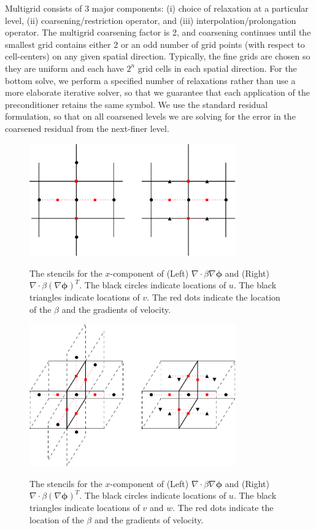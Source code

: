 \documentclass[final]{siamltex}
\def\phib {\boldsymbol{\phi}}
\begin{document}
Multigrid consists of 3 major components: (i) choice of relaxation at a particular level,
(ii) coarsening/restriction operator, and (iii) interpolation/prolongation operator.
The multigrid coarsening factor is 2, and coarsening continues until the smallest
grid contains either 2 or an odd number of grid points (with respect to cell-centers)
on any given spatial direction.  Typically, the fine grids are chosen so they are
uniform and each have $2^n$ grid cells in each spatial direction.
For the bottom solve, we perform a specified number of relaxations
rather than use a more elaborate iterative solver, so that we guarantee that each
application of the preconditioner retains the same symbol.  We use the standard residual
formulation, so that on all coarsened levels we are solving for the error in the
coarsened residual from the next-finer level.

\begin{figure}[tb]
\centering
\includegraphics[width=3.5in]{viscOp}
\label{fig:viscOp}
\caption{The stencils for the $x$-component of (Left) $\nabla\cdot\beta\nabla\phib$ and 
(Right) $\nabla\cdot\beta(\nabla\phib)^T$.  
The black circles indicate locations of $u$.
The black triangles indicate locations of $v$.
The red dots indicate the location of the $\beta$ and the gradients of velocity.}
\end{figure}
\begin{figure}[tb]
\centering
\includegraphics[width=3.5in]{viscOp_3d}
\label{fig:viscOp_3d}
\caption{The stencils for the $x$-component of (Left) $\nabla\cdot\beta\nabla\phib$ and
(Right) $\nabla\cdot\beta(\nabla\phib)^T$.  
The black circles indicate locations of $u$.
The black triangles indicate locations of $v$ and $w$.
The red dots indicate the location of the $\beta$ and the gradients of velocity.}
\end{figure}
\end{document}
